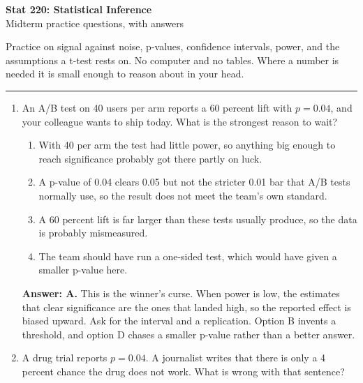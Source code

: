 \documentclass[11pt]{article}
\begin{document}
\begin{center}
{\Large\textbf{Stat 220: Statistical Inference}}\\[3pt]
{\large Midterm practice questions, with answers}\\[6pt]
\end{center}

Practice on signal against noise, p-values, confidence intervals, power, and the assumptions a
t-test rests on. No computer and no tables. Where a number is needed it is small enough to reason
about in your head.

\vspace{8pt}
\hrule
\vspace{10pt}

\begin{enumerate}[itemsep=14pt]
\item An A/B test on 40 users per arm reports a 60 percent lift with $p = 0.04$, and your colleague wants to ship today. What is the strongest reason to wait?

\begin{enumerate}[label=\Alph*., itemsep=1pt, topsep=3pt]
  \item With 40 per arm the test had little power, so anything big enough to reach significance probably got there partly on luck.
  \item A p-value of 0.04 clears 0.05 but not the stricter 0.01 bar that A/B tests normally use, so the result does not meet the team's own standard.
  \item A 60 percent lift is far larger than these tests usually produce, so the data is probably mismeasured.
  \item The team should have run a one-sided test, which would have given a smaller p-value here.
\end{enumerate}

\vspace{2pt}
\textbf{Answer: A.} This is the winner's curse. When power is low, the estimates that clear significance are the ones that landed high, so the reported effect is biased upward. Ask for the interval and a replication. Option B invents a threshold, and option D chases a smaller p-value rather than a better answer.
\vspace{4pt}

\item A drug trial reports $p = 0.04$. A journalist writes that there is only a 4 percent chance the drug does not work. What is wrong with that sentence?


\end{enumerate}
\end{document}
